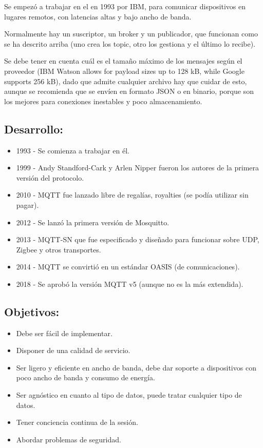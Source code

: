 \documentclass[12pt, twoside, openright]{report} %
\begin{document}
Se empezó a trabajar en el en 1993 por IBM, para comunicar dispositivos en lugares remotos, con latencias altas y bajo ancho de banda.

Normalmente hay un suscriptor, un broker y un publicador, que funcionan como se ha descrito arriba (uno crea los topic, otro los gestiona y el último lo recibe).

Se debe tener en cuenta cuál es el tamaño máximo de los mensajes según el proveedor (IBM Watson allows for payload sizes up to 128 kB, while Google supports 256 kB), dado que admite cualquier archivo hay que cuidar de esto, aunque se recomienda que se envíen en formato JSON o en binario, porque son los mejores para conexiones inestables y poco almacenamiento.

\subsection{Desarrollo:}
\begin{itemize}
	\item 1993 - Se comienza a trabajar en él.
	\item 1999 - Andy Standford-Cark y Arlen Nipper fueron los autores de la primera versión del protocolo.
	\item 2010 - MQTT fue lanzado libre de regalías, royalties (se podía utilizar sin pagar).
	\item 2012 - Se lanzó la primera versión de Mosquitto.
	\item 2013 - MQTT-SN que fue especificado y diseñado para funcionar sobre UDP, Zigbee y otros transportes.
	\item 2014 - MQTT se convirtió en un estándar OASIS (de comunicaciones).
	\item 2018 - Se aprobó la versión MQTT v5 (aunque no es la más extendida).
\end{itemize}

\subsection{Objetivos:}
\begin{itemize}
	\item Debe ser fácil de implementar.
	\item Disponer de una calidad de servicio.
	\item Ser ligero y eficiente en ancho de banda, debe dar soporte a dispositivos con poco ancho de banda y consumo de energía.
	\item Ser agnóstico en cuanto al tipo de datos, puede tratar cualquier tipo de datos.
	\item Tener conciencia continua de la sesión.
	\item Abordar problemas de seguridad.
\end{itemize}
\end{document}
